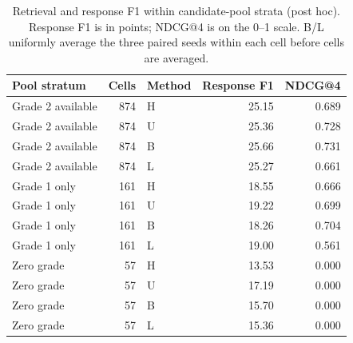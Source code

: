\begin{table}[htbp]\centering\small
\caption{Retrieval and response F1 within candidate-pool strata (post hoc). Response F1 is in points; NDCG@4 is on the 0--1 scale. B/L uniformly average the three paired seeds within each cell before cells are averaged.}\label{tab:strata2}
\begin{tabular}{lrlrr}\toprule
Pool stratum & Cells & Method & Response F1 & NDCG@4\\\midrule
Grade 2 available & 874 & H & 25.15 & 0.689\\
Grade 2 available & 874 & U & 25.36 & 0.728\\
Grade 2 available & 874 & B & 25.66 & 0.731\\
Grade 2 available & 874 & L & 25.27 & 0.661\\
\midrule
Grade 1 only & 161 & H & 18.55 & 0.666\\
Grade 1 only & 161 & U & 19.22 & 0.699\\
Grade 1 only & 161 & B & 18.26 & 0.704\\
Grade 1 only & 161 & L & 19.00 & 0.561\\
\midrule
Zero grade & 57 & H & 13.53 & 0.000\\
Zero grade & 57 & U & 17.19 & 0.000\\
Zero grade & 57 & B & 15.70 & 0.000\\
Zero grade & 57 & L & 15.36 & 0.000\\
\bottomrule\end{tabular}\end{table}
